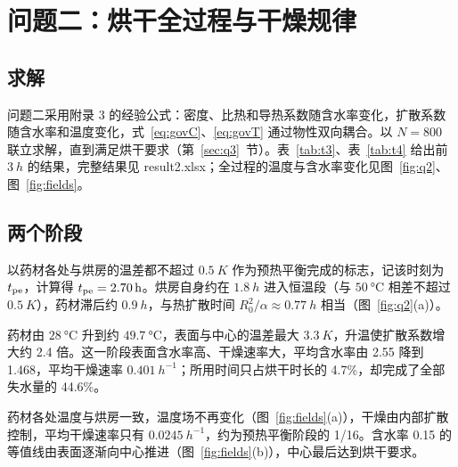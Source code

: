 \section{问题二：烘干全过程与干燥规律}\label{sec:q2}

\subsection{求解}

问题二采用附录 3 的经验公式：密度、比热和导热系数随含水率变化，扩散系数随含水率和温度变化，式~\eqref{eq:govC}、\eqref{eq:govT} 通过物性双向耦合。以 $N=800$ 联立求解，直到满足烘干要求（第~\ref{sec:q3}~节）。表~\ref{tab:t3}、表~\ref{tab:t4} 给出前 $\SI{3}{h}$ 的结果，完整结果见 result2.xlsx；全过程的温度与含水率变化见图~\ref{fig:q2}、图~\ref{fig:fields}。

\begin{table}[htbp]\centering\small
\caption{3 小时内药材的温度（\si{\celsius}）}\label{tab:t3}

\end{table}

\begin{table}[htbp]\centering\small
\caption{3 小时内药材的水分浓度（\si{kg/kg}）}\label{tab:t4}

\end{table}

\subsection{两个阶段}

以药材各处与烘房的温差都不超过 $\SI{0.5}{K}$ 作为预热平衡完成的标志，记该时刻为 $t_{\mathrm{pe}}$，计算得 $t_{\mathrm{pe}}=\SI{2.70}{h}$。烘房自身约在 $\SI{1.8}{h}$ 进入恒温段（与 $\SI{50}{\celsius}$ 相差不超过 $\SI{0.5}{K}$），药材滞后约 $\SI{0.9}{h}$，与热扩散时间 $R_0^2/\alpha\approx\SI{0.77}{h}$ 相当（图~\ref{fig:q2}(a)）。

 药材由 $\SI{28}{\celsius}$ 升到约 $\SI{49.7}{\celsius}$，表面与中心的温差最大 $\SI{3.3}{K}$，升温使扩散系数增大约 2.4 倍。这一阶段表面含水率高、干燥速率大，平均含水率由 2.55 降到 1.468，平均干燥速率 $\SI{0.401}{h^{-1}}$；所用时间只占烘干时长的 4.7\%，却完成了全部失水量的 44.6\%。

 药材各处温度与烘房一致，温度场不再变化（图~\ref{fig:fields}(a)），干燥由内部扩散控制，平均干燥速率只有 $\SI{0.0245}{h^{-1}}$，约为预热平衡阶段的 1/16。含水率 0.15 的等值线由表面逐渐向中心推进（图~\ref{fig:fields}(b)），中心最后达到烘干要求。

